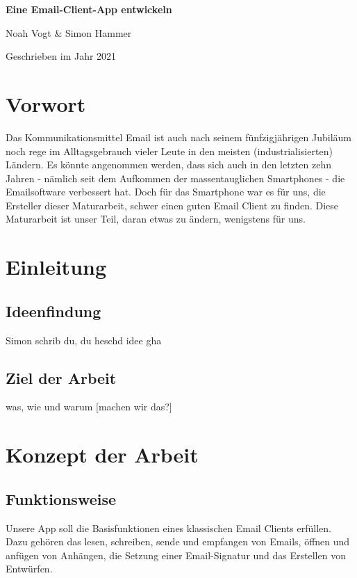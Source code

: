 \documentclass[a4paper,11pt]{article}
\begin{document}
\begin{titlepage}

\vspace*{1cm}
	\centering
	
	{\huge\bfseries Eine Email-Client-App entwickeln \par}
	\vspace{0.5cm}
	{\Large Noah Vogt \& Simon Hammer\par}
	\vspace{17cm}

	{\large Geschrieben im Jahr 2021\par}
	
\end{titlepage}

\tableofcontents
\pagebreak

\section{Vorwort}
Das Kommunikationsmittel Email ist auch nach seinem fünfzigjährigen Jubiläum noch rege im Alltagsgebrauch vieler Leute in den meisten (industrialisierten) Ländern. Es könnte angenommen werden,
dass sich auch in den letzten zehn Jahren - nämlich seit dem Aufkommen der massentauglichen Smartphones - die Emailsoftware verbessert hat. Doch für das Smartphone war es für uns, die Ersteller dieser Maturarbeit, schwer einen guten Email Client zu finden. Diese Maturarbeit ist unser Teil, daran etwas zu ändern, wenigstens für uns.
\section{Einleitung}
\subsection{Ideenfindung}
Simon schrib du, du heschd idee gha
\subsection{Ziel der Arbeit}

 was, wie und warum [machen wir das?]

\section{Konzept der Arbeit}

\subsection{Funktionsweise}
Unsere App soll die Basisfunktionen eines klassischen Email Clients erfüllen. Dazu gehören das lesen, schreiben, sende und empfangen von Emails, öffnen und anfügen von Anhängen, die Setzung einer Email-Signatur und das Erstellen von Entwürfen.
\end{document}
